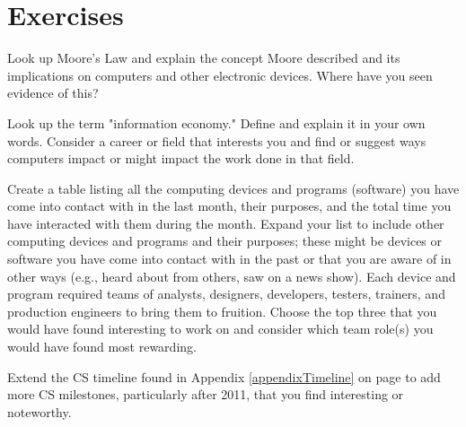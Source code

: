 \newpage

\section{Exercises}

\begin{ex}
	Look up Moore's Law and explain the concept Moore described and its implications on computers and other electronic devices. Where have you seen evidence of this?	
\end{ex}

\begin{ex}
	Look up the term "information economy." Define and explain it in your own words. Consider a career or field that interests you and find or suggest ways computers impact or might impact the work done in that field.
\end{ex}

\begin{ex}
	Create a table listing all the computing devices and programs (software) you have come into contact with in the last month, their purposes, and the total time you have interacted with them during the month. Expand your list to include other computing devices and programs and their purposes; these might be devices or software you have come into contact with in the past or that you are aware of in other ways (e.g., heard about from others, saw on a news show). Each device and program required teams of analysts, designers, developers, testers, trainers, and production engineers to bring them to fruition. Choose the top three that you would have found interesting to work on and consider which team role(s) you would have found most rewarding.
	 
\end{ex}

\begin{ex}\label{exCh18Timeline}
	Extend the CS timeline found in Appendix \ref{appendixTimeline} on page \pageref{appendixTimeline} to add more CS milestones, particularly after 2011, that you find interesting or noteworthy.
\end{ex}